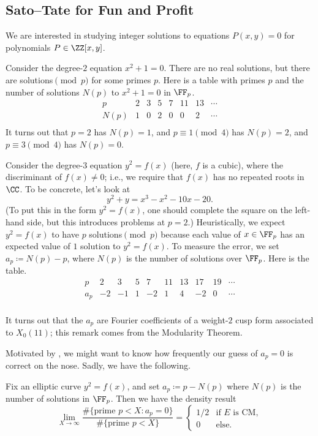 \documentclass{article}
\begin{document}
\subsection{Sato--Tate for Fun and Profit}
We are interested in studying integer solutions to equations $P(x,y)=0$ for polynomials $P\in\ZZ[x,y]$.
\begin{example}
	Consider the degree-$2$ equation $x^2+1=0$. There are no real solutions, but there are solutions$\pmod p$ for some primes $p$. Here is a table with primes $p$ and the number of solutions $N(p)$ to $x^2+1=0$ in $\FF_p$.
	\[\begin{array}{c|cccccccc}
		p & 2 & 3 & 5 & 7 & 11 & 13 & \cdots \\\hline
		N(p) & 1 & 0 & 2 & 0 & 0 & 2 & \cdots \\
	\end{array}\]
	It turns out that $p=2$ has $N(p)=1$, and $p\equiv1\pmod4$ has $N(p)=2$, and $p\equiv3\pmod4$ has $N(p)=0$.
\end{example}
\begin{example} \label{ex:ec}
	Consider the degree-$3$ equation $y^2=f(x)$ (here, $f$ is a cubic), where the discriminant of $f(x)\ne0$; i.e., we require that $f(x)$ has no repeated roots in $\CC$. To be concrete, let's look at
	\[y^2+y=x^3-x^2-10x-20.\]
	(To put this in the form $y^2=f(x)$, one should complete the square on the left-hand side, but this introduces problems at $p=2$.) Heuristically, we expect $y^2=f(x)$ to have $p$ solutions$\pmod p$ because each value of $x\in\FF_p$ has an expected value of $1$ solution to $y^2=f(x)$. To measure the error, we set $a_p\coloneqq N(p)-p$, where $N(p)$ is the number of solutions over $\FF_p$. Here is the table.
	\[\begin{array}{c|cccccccccc}
		p & 2 & 3 & 5 & 7 & 11 & 13 & 17 & 19 & \cdots \\\hline
		a_p & -2 & -1 & 1 & -2 & 1 & 4 & -2 & 0 &\cdots \\
	\end{array}\]
\end{example}
\begin{remark}
	It turns out that the $a_p$ are Fourier coefficients of a weight-$2$ cusp form associated to $X_0(11)$; this remark comes from the Modularity Theorem.
\end{remark}
Motivated by , we might want to know how frequently our guess of $a_p=0$ is correct on the nose.
Sadly, we have the following.
\begin{theorem}[Serre]
	Fix an elliptic curve $y^2=f(x)$, and set $a_p\coloneqq p-N(p)$ where $N(p)$ is the number of solutions in $\FF_p$. Then we have the density result
	\[\lim_{X\to\infty}\frac{\#\{\text{prime }p<X:a_p=0\}}{\#\{\text{prime }p<X\}}=\begin{cases}
		1/2 & \text{if }E\text{ is CM}, \\
		0 & \text{else}.
	\end{cases}\]
\end{theorem}
\end{document}
